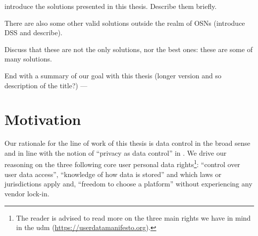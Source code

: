 \documentclass[showtrims]{kthesis}
\begin{document}
introduce the solutions presented 
in this thesis. Describe them briefly.

There are also some other valid solutions outside the realm of OSNs (introduce DSS 
and describe).

Discuss that these are not the only solutions, nor the best ones: these are some 
of many solutions.

End with a summary of our goal with this thesis (longer version and so description of the title?)
---


%
%
%
%
%
%
%

\section{Motivation}
Our rationale for the line of work of this thesis is data control in the broad sense 
and in line with the notion of ``privacy as data control'' in \cite{Allen99}. We 
drive our reasoning on the three following core user personal data rights\footnote{The 
reader is advised to read more on the three main rights we have in mind in the \ac{udm} 
(\url{https://userdatamanifesto.org}).}: ``control over user data access'', ``knowledge 
of how data is stored'' and which laws or jurisdictions apply and, ``freedom to 
choose a platform'' without experiencing any vendor lock-in.

\end{document}
